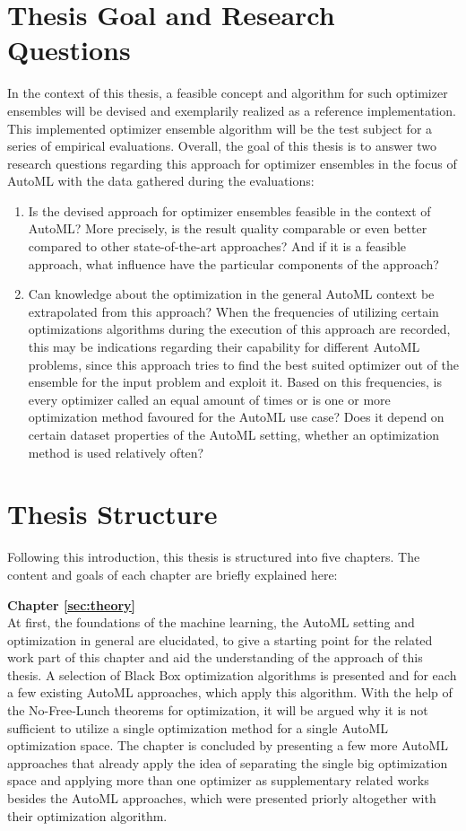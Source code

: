 \section{Thesis Goal and Research Questions}
\label{sec:intro:goal}
In the context of this thesis, a feasible concept and algorithm for such optimizer ensembles will be devised and exemplarily realized as a reference implementation.
This  implemented optimizer ensemble algorithm will be the test subject for a series of empirical evaluations.
Overall, the goal of this thesis is to answer two research questions regarding this approach for optimizer ensembles in the focus of AutoML with the data gathered during the evaluations:
\begin{enumerate}
    \item Is the devised approach for optimizer ensembles feasible in the context of AutoML?
    More precisely, is the result quality comparable or even better compared to other state-of-the-art approaches?
    And if it is a feasible approach, what influence have the particular components of the approach?
    \item Can knowledge about the optimization in the general AutoML context be extrapolated from this approach?
    When the frequencies of utilizing certain optimizations algorithms during the execution of this approach are recorded, this may be indications regarding their capability for different AutoML problems, since this approach tries to find the best suited optimizer out of the ensemble for the input problem and exploit it.
    Based on this frequencies, is every optimizer called an equal amount of times or is one or more optimization method favoured for the AutoML use case?
    Does it depend on certain dataset properties of the AutoML setting, whether an optimization method is used relatively often?
\end{enumerate}

\section{Thesis Structure}
\label{sec:intro:structure}
Following this introduction, this thesis is structured into five chapters.
The content and goals of each chapter are briefly explained here:

\textbf{Chapter \ref{sec:theory}} \\[0.2em]
At first, the foundations of the machine learning, the AutoML setting and optimization in general are elucidated, to give a starting point for the related work part of this chapter and aid the understanding of the approach of this thesis.
A selection of Black Box optimization algorithms is presented and for each a few existing AutoML approaches, which apply this algorithm.
With the help of the No-Free-Lunch theorems for optimization, it will be argued why it is not sufficient to utilize a single optimization method for a single AutoML optimization space.
The chapter is concluded by presenting a few more AutoML approaches that already apply the idea of separating the single big optimization space and applying more than one optimizer as supplementary related works besides the AutoML approaches, which were presented priorly altogether with their optimization algorithm.

